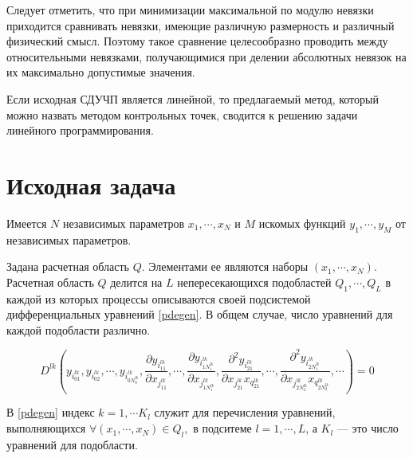 \documentclass[a4paper,12pt]{article}
\begin{document}
  Следует отметить, что при минимизации максимальной по модулю невязки
  приходится сравнивать невязки, имеющие различную размерность и
  различный физический смысл. Поэтому такое сравнение целесообразно
  проводить между относительными невязками, получающимися при делении
  абсолютных невязок на их максимально допустимые значения.
  
  Если исходная СДУЧП является линейной, то предлагаемый метод,
  который можно назвать методом контрольных точек, сводится к решению
  задачи линейного программирования.


  \section{Исходная задача}

  Имеется $N$ независимых параметров $x_1,\cdots,x_N$ и $M$ искомых
  функций $y_1,\cdots,y_M$ от независимых параметров.

  Задана расчетная область $Q$. Элементами ее являются наборы
  $(x_1,\cdots,x_N)$. Расчетная область $Q$ делится на $L$
  непересекающихся подобластей $Q_1,\cdots,Q_L$ в каждой из которых
  процессы описываются своей подсистемой дифференциальных
  уравнений \eqref{pdegen}. В общем случае, число уравнений для каждой
  подобласти различно.

  \begin{equation}
    \label{pdegen}
    D^{lk} (
    y_{i^{lk}_{01}}, y_{i^{lk}_{02}}, \cdots,y_{i^{lk}_{0N^{lk}_0}},
    \frac{\partial y_{i^{lk}_{11}}}{\partial x_{j^{lk}_{11}}},\cdots,
    \frac{\partial y_{i^{lk}_{1N^{lk}_1}}}{\partial x_{j^{lk}_{1N^{lk}_1}}},
    \frac{\partial^2 y_{i^{lk}_{21}}}{\partial x_{j^{lk}_{21}}x_{q^{lk}_{21}}},\cdots,
    \frac{\partial^2 y_{i^{lk}_{2N^{lk}_1}}}{\partial x_{j^{lk}_{2N^{lk}_2}}x_{q^{lk}_{2N^{lk}_2}}},
    \cdots) = 0
  \end{equation}

  В \eqref{pdegen} индекс $k = 1,\cdots K_l$ служит для перечисления
  уравнений, выполняющихся $\forall (x_1,\cdots,x_N) \in Q_l,$ в
  подситеме $l= 1,\cdots,L$, а $K_l$ --- это число уравнений для
  подобласти.

  
  
\end{document}
